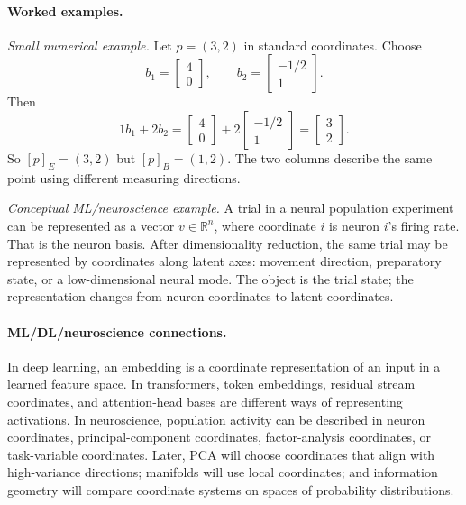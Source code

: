 \paragraph{Worked examples.}
\emph{Small numerical example.} Let \(p=(3,2)\) in standard coordinates. Choose
\[
b_1=\begin{bmatrix}4\\0\end{bmatrix},\qquad
b_2=\begin{bmatrix}-1/2\\1\end{bmatrix}.
\]
Then
\[
1b_1+2b_2=
\begin{bmatrix}4\\0\end{bmatrix}
+2\begin{bmatrix}-1/2\\1\end{bmatrix}
=\begin{bmatrix}3\\2\end{bmatrix}.
\]
So \([p]_E=(3,2)\) but \([p]_B=(1,2)\). The two columns describe the same point using different measuring directions.

\emph{Conceptual ML/neuroscience example.} A trial in a neural population experiment can be represented as a vector \(v\in\mathbb{R}^n\), where coordinate \(i\) is neuron \(i\)'s firing rate. That is the neuron basis. After dimensionality reduction, the same trial may be represented by coordinates along latent axes: movement direction, preparatory state, or a low-dimensional neural mode. The object is the trial state; the representation changes from neuron coordinates to latent coordinates.

\paragraph{ML/DL/neuroscience connections.}
In deep learning, an embedding is a coordinate representation of an input in a learned feature space. In transformers, token embeddings, residual stream coordinates, and attention-head bases are different ways of representing activations. In neuroscience, population activity can be described in neuron coordinates, principal-component coordinates, factor-analysis coordinates, or task-variable coordinates. Later, PCA will choose coordinates that align with high-variance directions; manifolds will use local coordinates; and information geometry will compare coordinate systems on spaces of probability distributions.

